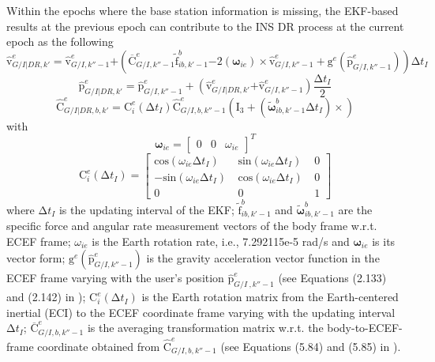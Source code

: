 \documentclass{article}
\begin{document}
Within the epochs where the base station information is missing, the EKF-based results at the previous epoch can contribute to the INS DR process at the current epoch as the following
\[{\hat{\boldsymbol{\mathrm{v}}}}^e_{G/I|DR,k'}={\hat{\boldsymbol{\mathrm{v}}}}^e_{G/I,k''-1}\boldsymbol{+}\left({\overline{\boldsymbol{\mathrm{C}}}}^e_{G/I,k''-1}{\tilde{\boldsymbol{\mathrm{f}}}}^b_{ib,k'-1}\boldsymbol{-}2\left({\boldsymbol{\omega }}_{ie}\right)\times {\hat{\boldsymbol{\mathrm{v}}}}^e_{G/I,k''-1}+{\boldsymbol{\mathrm{g}}}^e\left({\hat{\boldsymbol{\mathrm{p}}}}^e_{G/I,k''-1}\right)\right)\mathrm{\Delta }t_I\] 
\[{\hat{\boldsymbol{\mathrm{p}}}}^e_{G/I|DR,k'}\boldsymbol{=}{\hat{\boldsymbol{\mathrm{p}}}}^e_{G/I,k''-1}+\left({\hat{\boldsymbol{\mathrm{v}}}}^e_{G/I|DR,k'}\boldsymbol{+}{\hat{\boldsymbol{\mathrm{v}}}}^e_{G/I,k''-1}\right)\frac{\mathrm{\Delta }t_I}{2}\] 
\[{\hat{\boldsymbol{\mathrm{C}}}}^e_{G/I|DR,b,k'}\boldsymbol{=}{\boldsymbol{\mathrm{C}}}^e_i\left(\mathrm{\Delta }t_I\right){\hat{\boldsymbol{\mathrm{C}}}}^e_{G/I,b,k''-1}\left({\boldsymbol{\mathrm{I}}}_3+\left({\tilde{\boldsymbol{\omega }}}^b_{ib,k'-1}\mathrm{\Delta }t_I\right)\times \right)\] 
with
\[{\boldsymbol{\omega }}_{ie}={\left[ \begin{array}{ccc}
0 & 0 & {\omega }_{ie} \end{array}
\right]}^T\] 
\[{\boldsymbol{\mathrm{C}}}^e_i\left(\mathrm{\Delta }t_I\right)\boldsymbol{=}\left[ \begin{array}{ccc}
{\mathrm{cos} \left({\omega }_{ie}\mathrm{\Delta }t_I\right)\ } & {\mathrm{sin} \left({\omega }_{ie}\mathrm{\Delta }t_I\right)\ } & 0 \\ 
{\mathrm{-sin} \left({\omega }_{ie}\mathrm{\Delta }t_I\right)\ } & {\mathrm{cos} \left({\omega }_{ie}\mathrm{\Delta }t_I\right)\ } & 0 \\ 
0 & 0 & 1 \end{array}
\right]\] 
where $\mathrm{\Delta }t_I$ is the updating interval of the EKF; ${\tilde{\boldsymbol{\mathrm{f}}}}^b_{ib,k'-1}$ and ${\tilde{\boldsymbol{\omega }}}^b_{ib,k'-1}$ are the specific force and angular rate measurement vectors of the body frame w.r.t. ECEF frame; ${\omega }_{ie}$ is the Earth rotation rate, i.e., 7.292115e-5 rad/s and ${\boldsymbol{\omega }}_{ie}$ is its vector form; ${\boldsymbol{\mathrm{g}}}^e\left({\hat{\boldsymbol{\mathrm{p}}}}^e_{G/I,k''-1}\right)$ is the gravity acceleration vector function in the ECEF frame varying with the user's position ${\hat{\boldsymbol{\mathrm{p}}}}^e_{G/I\ ,k''-1}$ (see Equations (2.133) and (2.142) in \cite{Groves2013}); ${\boldsymbol{\mathrm{C}}}^e_i\left(\mathrm{\Delta }t_I\right)$\textbf{ }is the Earth rotation matrix from the Earth-centered inertial (ECI) to the ECEF coordinate frame varying with the updating interval $\mathrm{\Delta }t_I$; ${\overline{\boldsymbol{\mathrm{C}}}}^e_{G/I,b,k''-1}$ is\textbf{ }the averaging transformation matrix w.r.t. the body-to-ECEF-frame coordinate obtained from ${\hat{\boldsymbol{\mathrm{C}}}}^e_{G/I,b,k''-1}$\textbf{ }(see Equations (5.84) and (5.85) in \cite{Groves2013}). 
\end{document}
